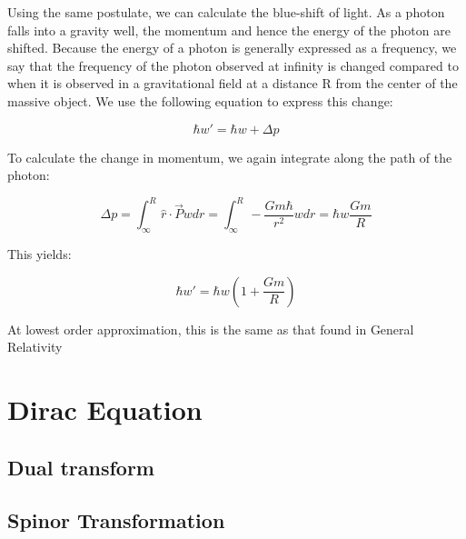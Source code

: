 \documentclass {article}
\begin{document}
Using the same postulate, we can calculate the blue-shift of light. As a photon falls into a gravity well, the momentum and hence the energy of the photon are shifted. Because the energy of a photon is generally expressed as a frequency, we say that the frequency of the photon observed at infinity is changed compared to when it is observed in a gravitational field at a distance R from the center of the massive object. We use the following equation to express this change:

$$\hbar w' = \hbar w + \Delta p $$

To calculate the change in momentum, we again integrate along the path of the photon:

$$\Delta p = \int_{\infty}^R \hat r \cdot \vec P w dr= \int_{\infty}^R - \frac {Gm\hbar}{r^2} w dr = \hbar w \frac {Gm}R $$

This yields:

$$\hbar w' = \hbar w \left( 1 + \frac {Gm}R \right) $$

At lowest order approximation, this is the same as that found in General Relativity

\newpage

\section{Dirac Equation}
\subsection{Dual transform}
\newpage
\subsection{Spinor Transformation}
\newpage
\end{document}
